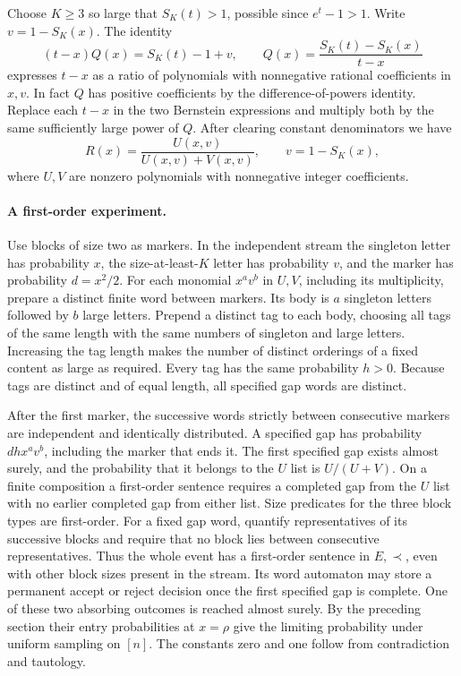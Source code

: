 \documentclass[11pt]{article}
\begin{document}
Choose $K\ge3$ so large that $S_K(t)>1$, possible since $e^t-1>1$. Write $v=1-S_K(x)$. The identity
\[
 (t-x)Q(x)=S_K(t)-1+v,\qquad
 Q(x)=\frac{S_K(t)-S_K(x)}{t-x}
\]
expresses $t-x$ as a ratio of polynomials with nonnegative rational coefficients in $x,v$. In fact $Q$ has positive coefficients by the difference-of-powers identity. Replace each $t-x$ in the two Bernstein expressions and multiply both by the same sufficiently large power of $Q$. After clearing constant denominators we have
\[
 R(x)=\frac{U(x,v)}{U(x,v)+V(x,v)},\qquad v=1-S_K(x),
\]
where $U,V$ are nonzero polynomials with nonnegative integer coefficients.

\paragraph{A first-order experiment.}
Use blocks of size two as markers. In the independent stream the singleton letter has probability $x$, the size-at-least-$K$ letter has probability $v$, and the marker has probability $d=x^2/2$. For each monomial $x^a v^b$ in $U,V$, including its multiplicity, prepare a distinct finite word between markers. Its body is $a$ singleton letters followed by $b$ large letters. Prepend a distinct tag to each body, choosing all tags of the same length with the same numbers of singleton and large letters. Increasing the tag length makes the number of distinct orderings of a fixed content as large as required. Every tag has the same probability $h>0$. Because tags are distinct and of equal length, all specified gap words are distinct.

After the first marker, the successive words strictly between consecutive markers are independent and identically distributed. A specified gap has probability $d h x^a v^b$, including the marker that ends it. The first specified gap exists almost surely, and the probability that it belongs to the $U$ list is $U/(U+V)$. On a finite composition a first-order sentence requires a completed gap from the $U$ list with no earlier completed gap from either list. Size predicates for the three block types are first-order. For a fixed gap word, quantify representatives of its successive blocks and require that no block lies between consecutive representatives. Thus the whole event has a first-order sentence in $E,\prec$, even with other block sizes present in the stream. Its word automaton may store a permanent accept or reject decision once the first specified gap is complete. One of these two absorbing outcomes is reached almost surely. By the preceding section their entry probabilities at $x=\rho$ give the limiting probability under uniform sampling on $[n]$. The constants zero and one follow from contradiction and tautology.
\end{document}
